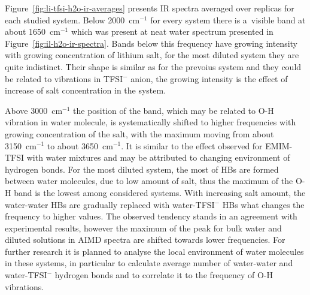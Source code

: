 Figure~\ref{fig:li-tfsi-h2o-ir-averages} presents IR spectra averaged over replicas for each studied system. Below 2000~cm$^{-1}$ for every system there is a~visible band at about 1650~cm$^{-1}$ which was present at neat water spectrum presented in Figure~\ref{fig:il-h2o-ir-spectra}. Bands below this frequency have growing intensity with growing concentration of lithium salt, for the most diluted system they are quite indistinct. Their shape is similar as for the prevoius system and they could be related to vibrations in TFSI$^{-}$ anion, the growing intensity is the effect of increase of salt concentration in the system.

Above 3000~cm$^{-1}$ the position of the band, which may be related to O-H vibration in water molecule, is systematically shifted to higher frequencies with growing concentration of the salt, with the maximum moving from about 3150~cm$^{-1}$ to about 3650~cm$^{-1}$. It is similar to the effect observed for EMIM-TFSI with water mixtures and may be attributed to changing environment of hydrogen bonds. For the most diluted system, the most of HBs are formed between water molecules, due to low amount of salt, thus the maximum of the O-H band is the lowest among considered systems. With increasing salt amount, the water-water HBs are gradually replaced with water-TFSI$^{-}$ HBs what changes the frequency to higher values. The observed tendency stands in an agreement with experimental results, however the maximum of the peak for bulk water and diluted solutions in AIMD spectra are shifted towards lower frequencies. For further research it is planned to analyse the local environment of water molecules in these systems, in particular to calculate average number of water-water and water-TFSI$^{-}$ hydrogen bonds and to correlate it to the frequency of O-H vibrations.